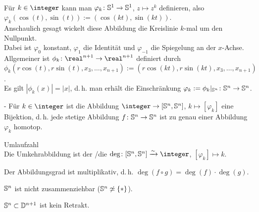 \begin{Bem}\\
    Für $k \in \integer$ kann man
    $\varphi_k\colon \mathbb{S}^1 \rightarrow \mathbb{S}^1$, $z \mapsto z^k$
    definieren, also
    $\varphi_k(\cos(t), \sin(t)) := (\cos(kt), \sin(kt))$. \\
    Anschaulich gesagt wickelt diese Abbildung die Kreislinie $k$-mal
    um den Nullpunkt. \\
    Dabei ist $\varphi_0$ konstant, $\varphi_1$ die Identität und
    $\varphi_{-1}$ die Spiegelung an der $x$-Achse. \\
    Allgemeiner ist $\phi_k\colon \real^{n+1} \rightarrow \real^{n+1}$
    definiert durch \\
    $\phi_k(r \cos(t), r \sin(t), x_3, \dotsc, x_{n+1}) :=
    (r \cos(kt), r \sin(kt), x_3, \dotsc, x_{n+1})$. \\
    Es gilt $|\phi_k(x)| = |x|$, d.\,h. man erhält die Einschränkung
    $\varphi_k := \phi_k|_{\mathbb{S}^n}\colon \mathbb{S}^n \rightarrow \mathbb{S}^n$.
\end{Bem}

\begin{Satz}{-}
    Für $k \in \integer$ ist die Abbildung
    $\integer \rightarrow [\sphere^n, \sphere^n]$,
    $k \mapsto [\varphi_k]$ eine Bijektion, d.\,h. jede stetige Abbildung
    $f\colon \mathbb{S}^n \rightarrow \mathbb{S}^n$ ist zu genau einer
    Abbildung $\varphi_k$ homotop.
\end{Satz}

\begin{Def}{Umlaufzahl}\\
    Die Umkehrabbildung ist der /die
    $\deg\colon [\sphere^n, \sphere^n] \bij \integer$,
    $[\varphi_k] \mapsto k$.
\end{Def}

\begin{Kor}
    Der Abbildungsgrad ist multiplikativ, d.\,h.
    $\deg(f \circ g) = \deg(f) \cdot \deg(g)$.
\end{Kor}

\linie

\begin{Kor}
    $\mathbb{S}^n$ ist nicht zusammenziehbar
    ($\mathbb{S}^n \not\simeq \{\ast\}$).
\end{Kor}

\begin{Kor}
    $\mathbb{S}^n \subset \mathbb{D}^{n+1}$ ist kein Retrakt.
\end{Kor}

